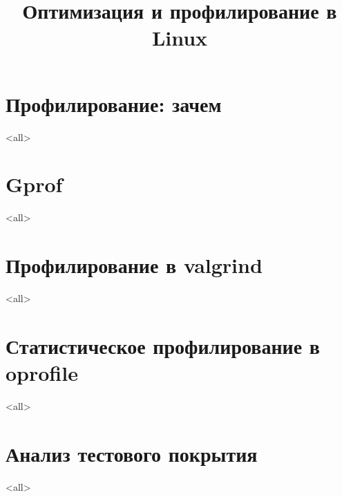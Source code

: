 

\title[Оптимизация и профилирование]{Оптимизация и профилирование в Linux}





\begin{frame}
	\frametitle{}
	\titlepage
	\vspace{-0.5cm}
	\begin{center}
	\end{center}
\end{frame}

\begin{frame}
	\tableofcontents
\end{frame}




\section{Профилирование: зачем}
\mode<all>{}

\section{Gprof}
\mode<all>{}

\section{Профилирование в valgrind}
\mode<all>{}

\section[oprofile]{Статистическое профилирование в oprofile}
\mode<all>{}

\section{Анализ тестового покрытия}
\mode<all>{}


